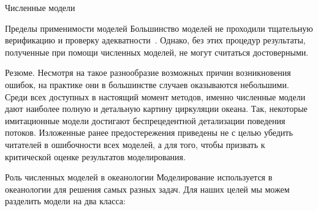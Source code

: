 \begin{chapter}{Численные модели}
\begin{section}{Пределы применимости моделей}
Большинство моделей не проходили тщательную верификацию и проверку
адекватности~\cite{Post:2005}. Однако, без этих процедур результаты,
полученные при помощи численных моделей, не могут считаться достоверными.
%

\begin{paragraph}{Резюме.}
Несмотря на такое разнообразие возможных причин возникновения ошибок, 
на практике они в большинстве случаев оказываются небольшими.
Среди всех доступных в настоящий момент методов, именно численные модели
дают наиболее полную и детальную картину циркуляции океана. 
Так, некоторые имитационные модели достигают беспрецедентной детализации 
поведения потоков. Изложенные ранее предостережения приведены не с целью 
убедить читателей в ошибочности всех моделей, а для того, чтобы призвать
к критической оценке результатов моделирования.
%
\end{paragraph}
\end{section}

\begin{section}{Роль численных моделей в океанологии}
Моделирование используется в океанологии для решения самых разных
задач. Для наших целей мы можем разделить модели на два класса:
%


\end{section}
\end{chapter}
